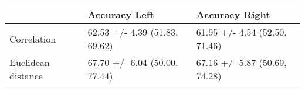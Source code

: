 \begin{tabular}{lll}
\toprule
{} &                  Accuracy Left &                 Accuracy Right \\
\midrule
Correlation        &  62.53 +/- 4.39 (51.83, 69.62) &  61.95 +/- 4.54 (52.50, 71.46) \\
Euclidean distance &  67.70 +/- 6.04 (50.00, 77.44) &  67.16 +/- 5.87 (50.69, 74.28) \\
\bottomrule
\end{tabular}
